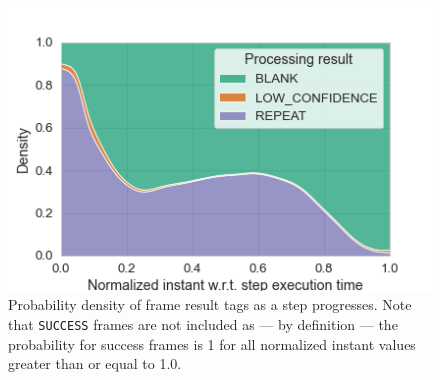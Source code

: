 \begin{figure}
    \centering
    \includegraphics[width=\columnwidth]{model_data/frame_probabilities.png}
    \caption{%
        Probability density of frame result tags as a step progresses.
        Note that \texttt{SUCCESS} frames are not included as --- by definition --- the probability for success frames is \num{1} for all normalized instant values greater than or equal to \num{1.0}.
    }\label{fig:frameprobs}
\end{figure}

